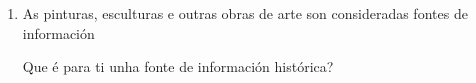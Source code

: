 \begin{multicols}{2}
\begin{ejercicio}
\begin{enumerate}[1)]
  \begin{enumerate}[1.]
   \item \dotfill 
   \item \dotfill 
   \item \dotfill 
   \item \dotfill 
  \end{enumerate}
 
 \item
 As pinturas, esculturas e outras obras de arte son consideradas fontes de información \par
 \dotfill
 \par
 Que é para ti unha fonte de información histórica?
 \par \vspace*{2.8cm}
 \end{enumerate}
\end{ejercicio}
%
\end{multicols}


